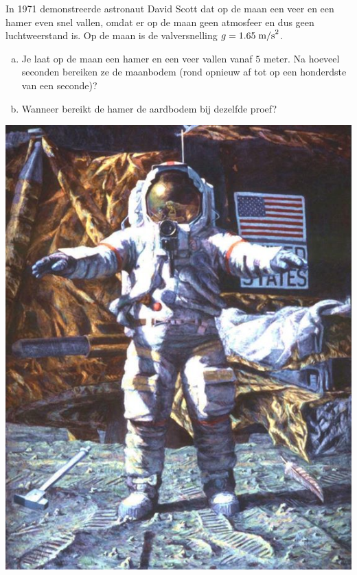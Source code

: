 \documentclass[12pt]{article}
\begin{document}
\begin{oefening}

  \begin{minipage}{0.7\textwidth}
    In 1971 demonstreerde astronaut David Scott dat op de maan een veer en een hamer even snel vallen, omdat er op de maan geen atmosfeer en dus geen luchtweerstand is. Op de maan is de valversnelling $g=1.65 \;\mbox{m/s}^2$.\\

    \begin{enumerate}[(a)]
    \item Je laat op de maan een hamer en een veer vallen vanaf $5$ meter. Na hoeveel seconden bereiken ze de maanbodem (rond opnieuw af tot op een honderdste van een seconde)?
    \item Wanneer bereikt de hamer de aardbodem bij dezelfde proef?
    \end{enumerate}
  \end{minipage}
  \begin{minipage}{0.29\textwidth}
    \vspace*{-0.4cm}
    \includegraphics[width=1\textwidth]{hammerfeather}
  \end{minipage}

\end{oefening}
\end{document}
